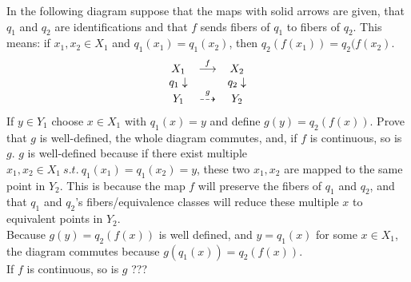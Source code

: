 \documentclass{jhwhw}
\begin{document}
\problem{} %
\noindent
In the following diagram suppose that the maps with solid arrows are given, that $q_1$ and $q_2$ are identifications and that $f$ sends fibers of $q_1$ to fibers of $q_2$.  This means:   if $x_1,x_2\in X_1$ and $q_1(x_1) = q_1(x_2)$, then $q_2(f(x_1)) = q_2(f(x_2)$.
\begin{eqnarray*}
	\begin{array}{ccc}
		X_1 & \buildrel f \over\longrightarrow & X_2 \\
		{q_1}\downarrow &  & {q_2}\downarrow\\
		Y_1 & \buildrel g \over\dashrightarrow & Y_2
	\end{array}
\end{eqnarray*}
If $y\in Y_1$ choose  $x\in X_1$ with $q_1(x) = y$ and define $g(y) = q_2(f(x))$.  Prove that $g$ is well-defined, the whole diagram commutes, and, if $f$ is continuous, so is $g$.
\solution{}
\noindent
$g$ is well-defined because if there exist multiple $x_1, x_2 \in X_1\ s.t.\ q_1(x_1)=q_1(x_2)=y$, these two $x_1, x_2$ are mapped to the same point in $Y_2$. This is because the map $f$ will preserve the fibers of $q_1$ and $q_2$, and that $q_1$ and $q_2$'s fibers/equivalence classes will reduce these multiple $x$ to equivalent points in $Y_2$.
\\

\noindent
Because $g(y) = q_2(f(x))$ is well defined, and $y=q_1(x)$ for some $x\in X_1$, the diagram commutes because $g(q_1(x)) = q_2(f(x))$.
\\

\noindent
If $f$ is continuous, so is $g$ ???
\end{document}
